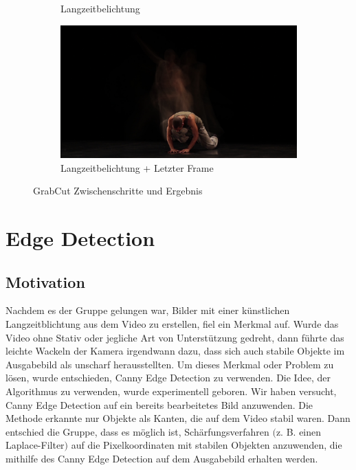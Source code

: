 \documentclass[12pt]{scrartcl}
\begin{document}
\begin{figure}[b]
\begin{subfigure}{0.5\linewidth}
		\caption{Langzeitbelichtung}
		\label{subfig:longexposure}
	\end{subfigure}
	\begin{subfigure}{0.5\linewidth}
		\includegraphics[width=\textwidth]{freeze_me_path.jpg}
		\caption{Langzeitbelichtung + Letzter Frame}
		\label{subfig:grabcutresult}
	\end{subfigure}
	\caption{GrabCut Zwischenschritte und Ergebnis}
	\label{fig:grabcutresultcomplex}
\end{figure}

\section{Edge Detection}
\subsection{Motivation}
Nachdem es der Gruppe gelungen war, Bilder mit einer k\"unstlichen Langzeitblichtung aus dem Video zu erstellen, fiel ein Merkmal auf. Wurde das Video ohne Stativ oder jegliche Art von Unterst\"utzung gedreht, dann f\"uhrte das leichte Wackeln der Kamera irgendwann dazu, dass sich auch stabile Objekte im Ausgabebild als unscharf herausstellten. Um dieses Merkmal oder Problem zu l\"osen, wurde entschieden, Canny Edge Detection zu verwenden.
Die Idee, der Algorithmus zu verwenden, wurde experimentell geboren. Wir haben versucht, Canny Edge Detection auf ein bereits bearbeitetes Bild anzuwenden. Die Methode erkannte nur Objekte als Kanten, die auf dem Video stabil waren. Dann entschied die Gruppe, dass es m\"oglich ist, Sch\"arfungsverfahren $($z. B. einen Laplace-Filter$)$ auf die Pixelkoordinaten mit stabilen Objekten anzuwenden, die mithilfe des Canny Edge Detection auf dem Ausgabebild erhalten werden.
\end{document}
